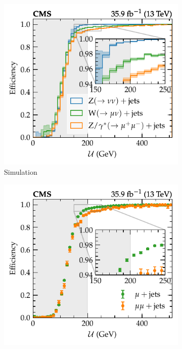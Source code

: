 \begin{figure}[htb]
    \centering
    \begin{subfigure}[b]{0.49\textwidth}
        \centering
        \includegraphics{chapters/041_corrections/images/efficiencies/triggers/met/met_trig_eff_mc_noisotrack.pdf}
        \caption{Simulation}
        \label{subfiga:ptmiss-trigger-eff-noisotrack}
    \end{subfigure}
    \hfill
    \begin{subfigure}[b]{0.49\textwidth}
        \centering
        \includegraphics{chapters/041_corrections/images/efficiencies/triggers/met/met_trig_eff_data_noisotrack.pdf}

\end{subfigure}
\end{figure}
